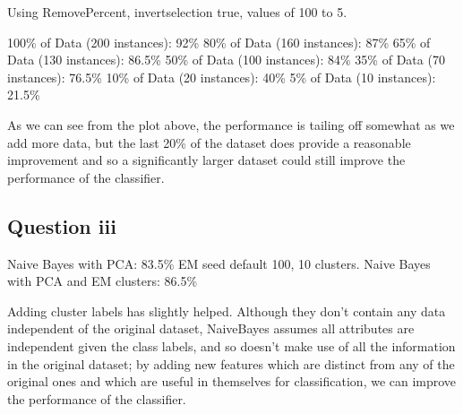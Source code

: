\documentclass[a4paper]{article}
\begin{document}
Using RemovePercent, invertselection true, values of 100 to 5.

100\% of Data (200 instances): 92\%
80\% of Data (160 instances): 87\%
65\% of Data (130 instances): 86.5\% 
50\% of Data (100 instances): 84\%
35\% of Data (70 instances): 76.5\%
10\% of Data (20 instances): 40\%
5\% of Data (10 instances): 21.5\%

As we can see from the plot above, the performance is tailing off somewhat as we add more data, but the last 20\% of the dataset does provide a reasonable improvement and so a significantly larger dataset could still improve the performance of the classifier.

\subsection*{Question iii}
Naive Bayes with PCA: 83.5\%
EM seed default 100, 10 clusters.
Naive Bayes with PCA and EM clusters: 86.5\%

Adding cluster labels has slightly helped. Although they don't contain any data independent of the original dataset, NaiveBayes assumes all attributes are independent given the class labels, and so doesn't make use of all the information in the original dataset; by adding new features which are distinct from any of the original ones and which are useful in themselves for classification, we can improve the performance of the classifier.
\end{document}
